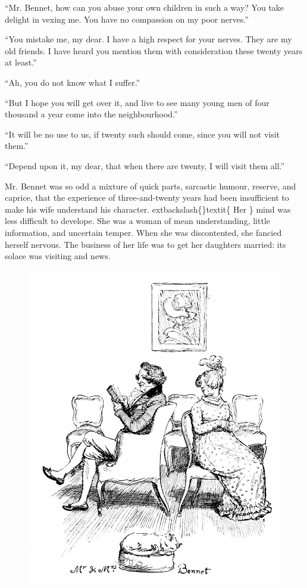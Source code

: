 \documentclass[10pt]{book}
\begin{document}
   “Mr. Bennet, how can you abuse your own children in such a way? You take
delight in vexing me. You have no compassion on my poor nerves.”
  

   “You mistake me, my dear. I have a high respect for your nerves. They
are my old friends. I have heard you mention them with consideration
these twenty years at least.”
  

   “Ah, you do not know what I suffer.”
  

   “But I hope you will get over it, and live to see many young men of four
thousand a year come into the neighbourhood.”
  

   “It will be no use to us, if twenty such should come, since you will not
visit them.”
  

   “Depend upon it, my dear, that when there are twenty, I will visit them
all.”
  

   Mr. Bennet was so odd a mixture of quick parts, sarcastic humour,
reserve, and caprice, that the experience of three-and-twenty years had
been insufficient to
   make his wife understand his character.
   	extbackslash\{\}textit\{
    Her
   \}
   mind
was less difficult to develope. She was a woman of mean understanding,
little information, and uncertain temper. When she was discontented, she
fancied herself nervous. The business of her life was to get her
daughters married: its solace was visiting and news.
  

\begin{figure}[h]
\centering
\includegraphics[width=\linewidth]{images/i_034.jpg}
\end{figure}
\end{document}
